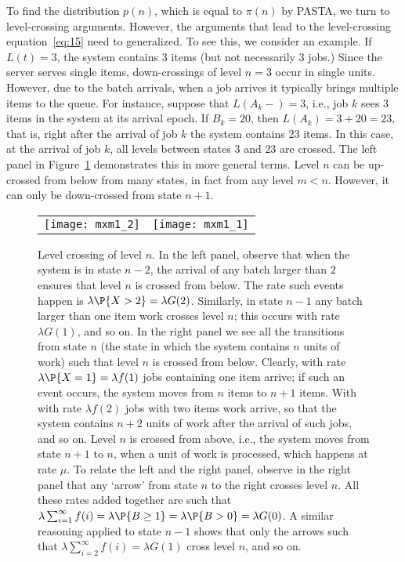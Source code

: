 To find the distribution $p(n)$, which is equal to $\pi(n)$ by PASTA,
we turn to level-crossing arguments. However, the arguments that lead
to the level-crossing equation~\eqref{eq:15} need to generalized.  To
see this, we consider an example.  If $L(t)=3$, the system contains
$3$ items (but not necessarily $3$ jobs.)  Since the server serves
single items, down-crossings of level $n=3$ occur in single
units. However, due to the batch arrivals, when a job arrives it
typically brings multiple items to the queue. For instance, suppose
that $L(A_k-) = 3$, i.e., job $k$ sees 3 items in the system at its
arrival epoch.  If $B_k = 20$, then $L(A_k)=3+20=23$, that is, right
after the arrival of job $k$ the system contains 23 items. In this
case, at the arrival of job $k$, all levels between states $3$ and
$23$ are crossed.  The left panel in Figure~\ref{fig:levelcrossing}
demonstrates this in more general terms.  Level $n$ can be up-crossed
from below from many states, in fact from any level $m <n$. However,
it can only be down-crossed from state $n+1$.



\begin{figure}
  \centering
  \begin{tabular}{cc}
    \texttt{[image: mxm1\_2]}
&
    \texttt{[image: mxm1\_1]}
  \end{tabular}
  \caption{Level crossing of level $n$.  In the left panel, observe
    that when the system is in state $n-2$, the arrival of any batch
    larger than $2$ ensures that level $n$ is crossed from below.  The
    rate such events happen is $\lambda \P{X>2} = \lambda G(2)$.
    Similarly, in state $n-1$ any batch larger than one item work
    crosses level $n$; this occurs with rate $\lambda G(1)$, and so
    on.  In the right panel we see all the transitions from state $n$
    (the state in which the system contains $n$ units of work) such
    that level $n$ is crossed from below.  Clearly, with rate
    $\lambda \P{X=1} = \lambda f(1)$ jobs containing one item arrive;
    if such an event occurs, the system moves from $n$ items to $n+1$
    items.  With with rate $\lambda f(2)$ jobs with two items work
    arrive, so that the system contains $n+2$ units of work after the
    arrival of such jobs, and so on. Level $n$ is crossed from above,
    i.e., the system moves from state $n+1$ to $n$, when a unit of
    work is processed, which happens at rate $\mu$. To relate the left
    and the right panel, observe in the right panel that any `arrow'
    from state $n$ to the right crosses level $n$. All these rates
    added together are such that
    $\lambda \sum_{i=1}^\infty f(i) = \lambda \P{B\geq 1} = \lambda
    \P{B>0} = \lambda G(0)$.
    A similar reasoning applied to state $n-1$ shows that only the
    arrows such that $\lambda \sum_{i=2}^\infty f(i) = \lambda G(1)$
    cross level $n$, and so on.  }
  \label{fig:levelcrossing}
\end{figure}

